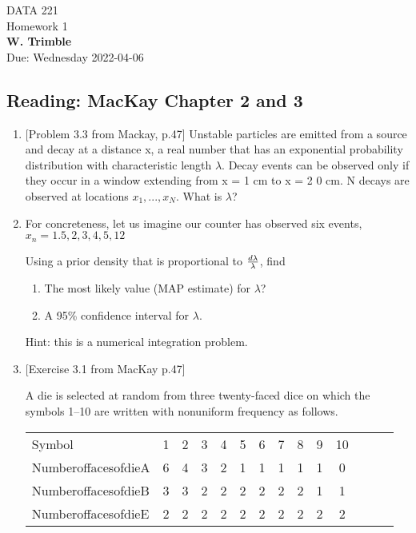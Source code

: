 \documentclass[12pt]{book}
\theoremstyle{definition}
\begin{document}
\begin{center}
{\Large DATA 221 \\  Homework 1 }\\
\textbf{W. Trimble}\\ %
Due: Wednesday 2022-04-06 
\end{center}

\vspace{0.2 cm}

\subsection*{Reading:  MacKay Chapter 2 and 3}

\begin{enumerate}
\item\label{cheese}
[Problem 3.3 from Mackay, p.47]
Unstable particles are emitted from a source and decay at a distance x, a real number that has an exponential probability distribution with characteristic length $\lambda $. Decay events can be observed only if they occur in a window extending from x = 1 cm to x = 2 0 cm. N decays are observed at locations ${x_1, . . . , x_N }$. What is $\lambda$? 



\item\label{breaths}
For concreteness, let us imagine our counter has observed six events, ${x_n} =  {1.5,2,3,4,5,12}$ 

Using a prior density that is proportional to ${d\lambda }\over {\lambda}$, find 
\begin{enumerate}
\item	The most likely value (MAP estimate) for $\lambda$? 
\item   A 95\% confidence interval for $\lambda$.
\end{enumerate}

Hint: this is a numerical integration problem.

\item\label{toscientific}
[Exercise 3.1 from MacKay p.47] 

A die is selected at random from three twenty-faced dice on which the symbols 1–10 are written with nonuniform frequency as follows.

\begin{tabular} {l c c c c c c c c c c c c c }
Symbol& 1& 2 &3 &4 &5 &6 &7 &8 &9 &10 \\
NumberoffacesofdieA& 6& 4 &3 &2 &1 &1 &1 &1 &1 &0  \\
NumberoffacesofdieB& 3 &3 &2 &2 &2 &2 &2 &2 &1 &1 \\
NumberoffacesofdieE& 2 &2 &2 &2 &2 &2 &2& 2& 2& 2 \\
\end{tabular}


\end{enumerate}
\end{document}
